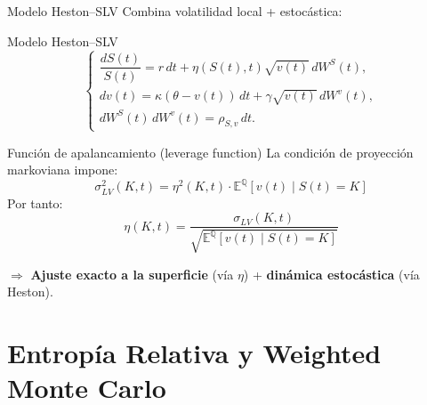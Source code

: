\documentclass[8pt]{beamer}
\begin{document}
\begin{frame}{Modelo Heston--SLV}
    Combina volatilidad local + estocástica:
    \begin{block}{Modelo Heston--SLV}
    \[
    \begin{cases}
    \dfrac{dS(t)}{S(t)} = r\,dt+\eta(S(t),t)\sqrt{v(t)}\,dW^S(t), \\[0.25cm]
    dv(t) = \kappa(\theta-v(t))\,dt+\gamma\sqrt{v(t)}\,dW^v(t), \\[0.25cm]
    dW^S(t)\,dW^v(t)=\rho_{S,v}\,dt.
    \end{cases}
    \]
    \end{block}
    \pause
    
    \begin{block}{Función de apalancamiento (leverage function)}
        La condición de proyección markoviana impone:
        \[
            \sigma_{LV}^2(K,t) = \eta^2(K,t)\cdot\mathbb{E}^\mathbb{Q}\left[v(t) \mid S(t)=K\right]
        \]
        Por tanto:
        \[
            \boxed{\eta(K,t) = \frac{\sigma_{LV}(K,t)}{\sqrt{\mathbb{E}^\mathbb{Q}\left[v(t) \mid S(t)=K\right]}}}
        \]
    \end{block}
    \pause
    
    $\Longrightarrow$ \textbf{Ajuste exacto a la superficie} (vía $\eta$) + \textbf{dinámica estocástica} (vía Heston).
\end{frame}


\section{Entropía Relativa y Weighted Monte Carlo}
\end{document}
